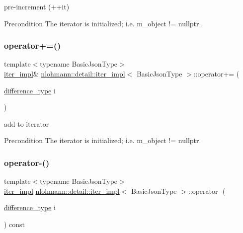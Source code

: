 pre-\/increment (++it) 

\begin{DoxyPrecond}{Precondition}
The iterator is initialized; i.\+e. {\ttfamily m\+\_\+object != nullptr}. 
\end{DoxyPrecond}
\mbox{\label{classnlohmann_1_1detail_1_1iter__impl_a3eef94f9d167046e7f773aeb6b78090c}} 
\subsubsection{\texorpdfstring{operator+=()}{operator+=()}}
{\footnotesize\ttfamily template$<$typename Basic\+Json\+Type$>$ \\
\hyperlink{classnlohmann_1_1detail_1_1iter__impl}{iter\+\_\+impl}\& \hyperlink{classnlohmann_1_1detail_1_1iter__impl}{nlohmann\+::detail\+::iter\+\_\+impl}$<$ Basic\+Json\+Type $>$\+::operator+= (\begin{DoxyParamCaption}\item[{\hyperlink{classnlohmann_1_1detail_1_1iter__impl_a2f7ea9f7022850809c60fc3263775840}{difference\+\_\+type}}]{i }\end{DoxyParamCaption})\hspace{0.3cm}{\ttfamily [inline]}}



add to iterator 

\begin{DoxyPrecond}{Precondition}
The iterator is initialized; i.\+e. {\ttfamily m\+\_\+object != nullptr}. 
\end{DoxyPrecond}
\mbox{\label{classnlohmann_1_1detail_1_1iter__impl_a0dd9c415b94a02ff2aa25da75e52da30}} 
\subsubsection{\texorpdfstring{operator-\/()}{operator-()}\hspace{0.1cm}{\footnotesize\ttfamily [1/2]}}
{\footnotesize\ttfamily template$<$typename Basic\+Json\+Type$>$ \\
\hyperlink{classnlohmann_1_1detail_1_1iter__impl}{iter\+\_\+impl} \hyperlink{classnlohmann_1_1detail_1_1iter__impl}{nlohmann\+::detail\+::iter\+\_\+impl}$<$ Basic\+Json\+Type $>$\+::operator-\/ (\begin{DoxyParamCaption}\item[{\hyperlink{classnlohmann_1_1detail_1_1iter__impl_a2f7ea9f7022850809c60fc3263775840}{difference\+\_\+type}}]{i }\end{DoxyParamCaption}) const\hspace{0.3cm}{\ttfamily [inline]}}




